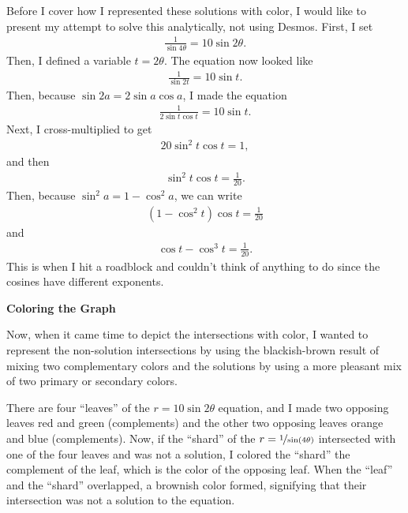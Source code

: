 Before I cover how I represented these solutions with color, I would like to present my attempt to solve this analytically, not using Desmos. First, I set
\begin{align*}
    \frac{1}{\sin{4\theta}} = 10\sin{2\theta}.
\end{align*}
Then, I defined a variable $t = 2\theta$. The equation now looked like \begin{align*}
    \frac{1}{\sin{2t}} = 10\sin{t}.
\end{align*}
Then, because $\sin{2a} = 2\sin{a}\cos{a}$, I made the equation
\begin{align*}
    \frac{1}{2\sin{t}\cos{t}} = 10\sin{t}.
\end{align*}
Next, I cross-multiplied to get
\begin{align*}
    20\sin^2{t}\cos{t} = 1,   
\end{align*}
and then
\begin{align*}
    \sin^2{t}\cos{t} = \frac{1}{20}.   
\end{align*}
Then, because $\sin^2{a} = 1 - \cos^2{a}$, we can write
\begin{align*}
    \left(1 - \cos^2{t}\right)\cos{t} = \frac{1}{20}   
\end{align*}
and
\begin{align*}
    \cos{t} - \cos^3{t} = \frac{1}{20}.   
\end{align*}
This is when I hit a roadblock and couldn't think of anything to do since the cosines have different exponents.

\noindent
\textbf{Coloring the Graph}

Now, when it came time to depict the intersections with color, I wanted to represent the non-solution intersections by using the blackish-brown result of mixing two complementary colors and the solutions by using a more pleasant mix of two primary or secondary colors.

There are four ``leaves'' of the $r = 10\sin{2\theta}$ equation, and I made two opposing leaves red and green (complements) and the other two opposing leaves orange and blue (complements). Now, if the ``shard'' of the $r = \nicefrac{1}{\sin(4\theta)}$ intersected with one of the four leaves and was not a solution, I colored the ``shard'' the complement of the leaf, which is the color of the opposing leaf. When the ``leaf'' and the ``shard'' overlapped, a brownish color formed, signifying that their intersection was not a solution to the equation.

